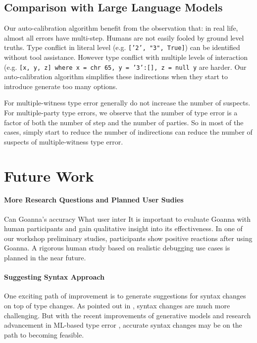 \documentclass[pdflatex,sn-mathphys-num]{sn-jnl}%
\begin{document}
\subsection{Comparison with Large Language Models}
    
Our auto-calibration algorithm benefit from the observation that: in real life, almost all errors have multi-step. Humans are not easily fooled by ground level truths. Type conflict in literal level (e.g. \texttt{['2', "3", True]}) can be identified without tool assistance. However type conflict with multiple levels of interaction (e.g. \texttt{[x, y, z] where x = chr 65, y = '3':[], z = null y} are harder. Our auto-calibration algorithm simplifies these indirections when they start to introduce generate too many options. 

For multiple-witness type error generally do not increase the number of suspects. For multiple-party type errors, we observe that the number of type error is a factor of both the number of step and the number of parties. So in most of the cases, simply start to reduce the number of indirections can reduce the number of suspects of multiple-witness type error.


\section{Future Work}\label{sec:future-work}
\paragraph{\textbf{More Research Questions and Planned User Sudies}}
Can Goanna's accuracy
What user inter
It is important to evaluate Goanna with human participants and gain qualitative insight into its effectiveness. In one of our workshop preliminary studies, participants show positive reactions after using Goanna. A rigorous human study based on realistic debugging use cases is planned in the near future.   
  	
\paragraph{\textbf{Suggesting Syntax Approach}}
    One exciting path of improvement is to generate suggestions for syntax changes on top of type changes. As pointed out in \cite{Chen2014-dz}, syntax changes are much more challenging. But with the recent improvements of generative models and research advancement in ML-based type error \cite{Seidel2017-uf}, accurate syntax changes may be on the path to becoming feasible.
\end{document}
